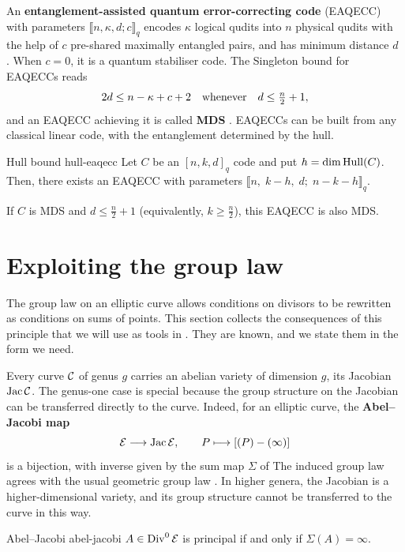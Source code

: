 \documentclass[twocolumn, 11pt]{scrartcl}
\begin{document}
An \textbf{entanglement-assisted quantum error-correcting code} (EAQECC) with parameters $\llbracket n,\kappa,d;c\rrbracket_q$ encodes $\kappa$ logical qudits into $n$ physical qudits with the help of $c$ pre-shared maximally entangled pairs, and has minimum distance $d$ \cite{brun2006correcting}. When $c=0$, it is a quantum stabiliser code. The Singleton bound for EAQECCs reads
\[ 2d\leq n-\kappa+c+2 \quad\text{whenever}\quad d\leq\tfrac{n}{2}+1, \]
and an EAQECC achieving it is called \textbf{MDS} \cite{lai2018linear}. EAQECCs can be built from any classical linear code, with the entanglement determined by the hull.

\begin{lemma}{Hull bound \cite[Lem.~16]{chen2023hulls}}{hull-eaqecc}
    Let $C$ be an $[n,k,d]_q$ code and put $h=\dim\operatorname{Hull}(C)$. Then, there exists an EAQECC with parameters $\llbracket n,\;k-h,\;d;\;n-k-h\rrbracket_q$.


    If $C$ is MDS and $d\leq\frac{n}{2}+1$ (equivalently, $k\geq\frac n2$), this EAQECC is also MDS.
\end{lemma}

\section{Exploiting the group law} \label{section:group-law}

The group law on an elliptic curve allows conditions on divisors to be rewritten as conditions on sums of points. This section collects the consequences of this principle that we will use as tools in . They are known, and we state them in the form we need.

Every curve $\mathcal{C}$ of genus $g$ carries an abelian variety of dimension $g$, its Jacobian $\operatorname{Jac}\mathcal{C}$. The genus-one case is special because the group structure on the Jacobian can be transferred directly to the curve. Indeed, for an elliptic curve, the \textbf{Abel--Jacobi map}
\[ \mathcal{E}\longrightarrow\operatorname{Jac}\mathcal{E}, \qquad P\longmapsto[(P)-(\infty)] \]
is a bijection, with inverse given by the sum map $\Sigma$ of  The induced group law agrees with the usual geometric group law \cite[\S III.3]{silverman2009arithmetic}. In higher genera, the Jacobian is a higher-dimensional variety, and its group structure cannot be transferred to the curve in this way.

\begin{lemma}{Abel--Jacobi \cite[Cor.~III.3.5]{silverman2009arithmetic}}{abel-jacobi}
    $A\in\operatorname{Div}^0\mathcal{E}$ is principal if and only if $\Sigma(A)=\infty$.
\end{lemma}
\end{document}

